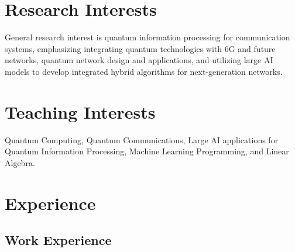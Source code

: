 \documentclass[10pt]{article}
\begin{document}
\section*{Research Interests}

\noindent General research interest is quantum information processing for communication systems, emphasizing integrating quantum technologies with 6G and future networks, quantum network design and applications, and utilizing large AI models to develop integrated hybrid algorithms for next-generation networks.

\section*{Teaching Interests}
\noindent 
Quantum Computing,
Quantum Communications,
Large AI applications for Quantum  Information Processing,
Machine Learning Programming, 
and
Linear Algebra.



\section*{Experience}

\subsection*{Work Experience}
\end{document}
